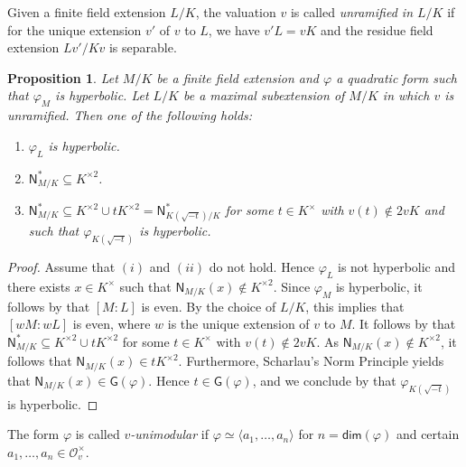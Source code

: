 \documentclass[twoside,11pt]{amsart}
\numberwithin{equation}{section}
\newtheorem{prop}[equation]{Proposition}
\theoremstyle{definition}
\renewcommand{\dim}{\operatorname{\mathsf{dim}}}
\newcommand\N{\operatorname{N}}
\newcommand{\vf}{\varphi}
\newcommand{\mg}[1]{{#1}^{\times}}
\newcommand{\sq}[1]{{#1}^{\times 2}}
\newcommand{\la}{\langle}
\newcommand{\ra}{\rangle}
\newcommand{\mc}{\mathcal}
\renewcommand{\N}{\mathsf{N}}
\newcommand{\G}{\mathsf{G}}
\renewcommand{\dim}{\mathsf{dim}}
\begin{document}
Given a finite field extension $L/K$, the valuation $v$ is called \emph{unramified in $L/K$} if for the unique extension $v'$ of $v$ to $L$, we have $v'L=vK$ and the residue field extension $Lv'/Kv$ is separable.

\begin{prop}\label{P:hens-hyp-norms-trichotomy}
    Let $M/K$ be a finite field extension and  $\varphi$ a quadratic form such that $\varphi_M$ is hyperbolic.
    Let $L/K$ be a maximal subextension of $M/K$ in which $v$ is unramified.
    Then one of the following holds:
    \begin{enumerate}[$(i)$]
        \item $\varphi_{L}$ is hyperbolic. 
        \item $\N_{M/K}^\ast\subseteq\sq{K}$.
        \item $\N_{M/K}^\ast\subseteq \sq{K}\cup t\sq{K}=\N^\ast_{K(\sqrt{-t})/K}$ for some $t\in \mg{K}$ with $v(t)\notin 2vK$ and such that $\varphi_{K(\sqrt{-t})}$ is hyperbolic.
    \end{enumerate}
\end{prop}
\begin{proof}
    Assume that $(i)$ and $(ii)$ do not hold.
    Hence $\varphi_L$ is not hyperbolic and there exists $x\in \mg{K}$ such that $\N_{M/K}(x)\notin\sq{K}$. 
    Since $\varphi_M$ is hyperbolic, it follows by \cite[Chap.~VII, Cor.~2.6]{Lam05}
    that $[M:L]$ is even.
    By the choice of $L/K$, this implies that $[wM:wL]$ is even, where $w$ is the unique extension of $v$ to $M$.
    It follows by  that $\N^\ast_{M/K}\subseteq \sq{K}\cup t\sq{K}$ for some $t\in\mg{K}$ with $v(t)\notin 2vK$.
    As $\N_{M/K}(x)\notin \sq{K}$, it follows that $\N_{M/K}(x)\in t\sq{K}$.
    Furthermore,  Scharlau's Norm Principle \cite[Chap.~VII, Theorem~4.3]{Lam05} yields that $\N_{M/K}(x)\in \G(\varphi)$.
    Hence $t\in\G(\varphi)$, and we conclude by  that $\varphi_{K(\sqrt{-t})}$ is hyperbolic.
    \end{proof}

The form $\varphi$ is called \emph{$v$-unimodular} if $\vf\simeq \la a_1,\dots,a_n\ra$ for $n=\dim(\vf)$ and certain $a_1,\dots,a_n\in\mg{\mc{O}}_v$.
\end{document}
